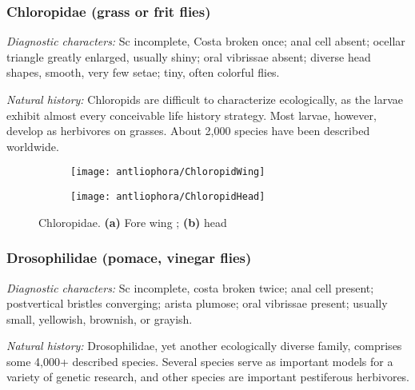 \subsubsection{Chloropidae (grass or frit flies)}
\noindent{}\textit{Diagnostic characters:} Sc incomplete, Costa broken once; anal cell absent; ocellar triangle greatly enlarged, usually shiny; oral vibrissae absent; diverse head shapes, smooth, very few setae; tiny, often colorful flies.\vspace{3mm}

\noindent{}\textit{Natural history:} Chloropids are difficult to characterize ecologically, as the larvae exhibit almost every conceivable life history strategy. Most larvae, however, develop as herbivores on grasses. About 2,000 species have been described worldwide.

\begin{figure}[ht!]
    \centering
    \begin{subfigure}[ht!]{0.5\textwidth}
        \texttt{[image: antliophora/ChloropidWing]}
        \caption{}
        \label{fig:chloropid1}
    \end{subfigure}
    \qquad
    \begin{subfigure}[ht!]{0.25\textwidth}
        \texttt{[image: antliophora/ChloropidHead]}
        \caption{}
        \label{fig:chloropid2}
    \end{subfigure}
    \caption{Chloropidae. \textbf{(a)} Fore wing \citep[][Fig. 99.36]{mcalpine1981manualv2}; \textbf{(b)} head \citep[][Fig. 99.3]{mcalpine1981manualv2}}\label{fig:chloropids}
\end{figure}

\subsubsection{Drosophilidae (pomace, vinegar flies)}
\noindent{}\textit{Diagnostic characters:} Sc incomplete, costa broken twice; anal cell present; postvertical bristles converging; arista plumose; oral vibrissae present; usually small, yellowish, brownish, or grayish.\vspace{3mm}

\noindent{}\textit{Natural history:} Drosophilidae, yet another ecologically diverse family, comprises some 4,000+ described species. Several species serve as important models for a variety of genetic research, and other species are important pestiferous herbivores.

